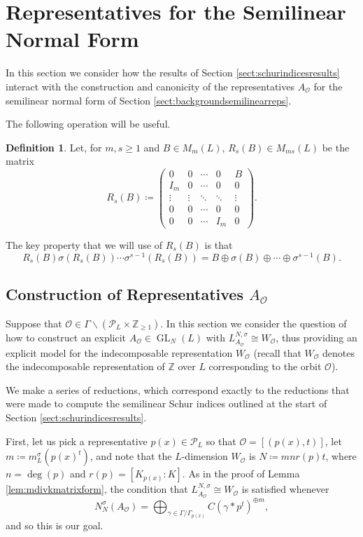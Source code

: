 \documentclass[10pt, reqno, hidelinks]{amsart}
\newcommand{\OO}{\mathcal{O}}
\DeclareMathOperator{\GL}{GL}
\newcommand{\bZ}{{\mathbb Z}}
\newcommand{\sP}{{\mathcal P}}
\numberwithin{thm}{subsection}
\theoremstyle{definition}
\newtheorem{defn}[thm]{Definition}
\begin{document}
\section{Representatives for the Semilinear Normal Form}\label{sect:representatives}

In this section we consider how the results of Section \ref{sect:schurindicesresults} interact with the construction and canonicity of the representatives $A_{\OO}$ for the semilinear normal form of Section \ref{sect:backgroundsemilinearreps}.

The following operation will be useful.

\begin{defn}
Let, for $m, s \geq 1$ and $B \in M_{m}(L)$, $R_s(B) \in M_{ms}(L)$ be the matrix
\[
R_s(B) \coloneqq \begin{pmatrix}
    0 & 0 &\cdots & 0 & B \\
    I_{m} & 0 & \cdots & 0 & 0 \\
    \vdots & \vdots & \ddots & \ddots & \vdots \\
    0 & 0 & \cdots & 0 & 0 \\
    0 & 0 & \cdots & I_{m} & 0
\end{pmatrix}.
\]
\end{defn} 
The key property that we will use of $R_s(B)$ is that
\[
R_s(B) \sigma(R_s(B)) \cdots \sigma^{s-1}(R_s(B)) = B \oplus \sigma(B) \oplus \cdots \oplus \sigma^{s-1}(B).
\]

\subsection{Construction of Representatives $A_{\OO}$}

Suppose that $\OO \in \Gamma \backslash (\sP_L \times \bZ_{\geq 1})$. In this section we consider the question of how to construct an explicit $A_{\OO} \in \GL_{N}(L)$ with $L^{N, \sigma}_{A_{\OO}} \cong W_{\OO}$, thus providing an explicit model for the indecomposable representation $W_{\OO}$ (recall that $W_{\OO}$ denotes the indecomposable representation of $\bZ$ over $L$ corresponding to the orbit $\OO$).

We make a series of reductions, which correspond exactly to the reductions that were made to compute the semilinear Schur indices outlined at the start of Section \ref{sect:schurindicesresults}.

First, let us pick a representative $p(x) \in \sP_L$ so that $\OO = [(p(x), t)]$, let $m \coloneqq m_L^{\sigma}(p(x)^t)$, and note that the $L$-dimension $W_{\OO}$ is $N \coloneqq mnr(p)t$, where $n = \deg(p)$ and $r(p) = [K_{p(x)} : K]$. As in the proof of Lemma \ref{lem:mdivkmatrixform}, the condition that $L^{N, \sigma}_{A_{\OO}} \cong W_{\OO}$ is satisfied whenever
\[
N^{\sigma}_{N}(A_{\OO}) = \bigoplus_{\gamma \in \Gamma / \Gamma_{p(x)}} C(\gamma * p^t)^{\oplus m},
\]
and so this is our goal.
\end{document}
